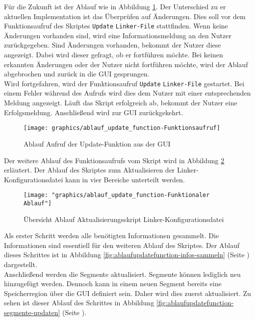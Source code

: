 Für die Zukunft ist der Ablauf wie in Abbildung \ref{fig:ablaufupdatefunction-funktionsaufruf}.
Der Unterschied zu er aktuellen Implementation ist das Überprüfen auf Änderungen.
Dies soll vor dem Funktionsaufruf des Skriptes \verb*|Update| \verb*|Linker-File| stattfinden.
Wenn keine Änderungen vorhanden sind, wird eine Informationsmeldung an den Nutzer zurückgegeben.
Sind Änderungen vorhanden, bekommt der Nutzer diese angezeigt.
Dabei wird dieser gefragt, ob er fortführen möchte.
Bei keinen erkannten Änderungen oder der Nutzer nicht fortführen möchte, wird der Ablauf abgebrochen und zurück in die \ac{GUI} gesprungen. \\

Wird fortgefahren, wird der Funktionsaufruf \verb*|Update| \verb*|Linker-File| gestartet.
Bei einem Fehler während des Aufrufs wird dies dem Nutzer mit einer entsprechenden Meldung angezeigt.
Läuft das Skript erfolgreich ab, bekommt der Nutzer eine Erfolgsmeldung.
Anschließend wird zur \ac{GUI} zurückgekehrt. \\

\begin{figure}[H]
	\centering
	\texttt{[image: graphics/ablauf\_update\_function-Funktionsaufruf]}
	\caption{Ablauf Aufruf der Update-Funktion aus der GUI}
	\label{fig:ablaufupdatefunction-funktionsaufruf}
\end{figure}

Der weitere Ablauf des Funktionsaufrufs vom Skript wird in Abbildung \ref{fig:ablaufupdatefunction-funktionaler-ablauf} erläutert.
Der Ablauf des Skriptes zum Aktualisieren der Linker-Konfigurationsdatei kann in vier Bereiche unterteilt werden. \\

\begin{figure}[H]
	\centering
	\texttt{[image: "graphics/ablauf\_update\_function-Funktionaler Ablauf"]}
	\caption{Übersicht Ablauf Aktualisierungsskript Linker-Konfigurationsdatei}
	\label{fig:ablaufupdatefunction-funktionaler-ablauf}
\end{figure}

Als erster Schritt werden alle benötigten Informationen gesammelt.
Die Informationen sind essentiell für den weiteren Ablauf des Skriptes.
Der Ablauf dieses Schrittes ist in Abbildung \ref{fig:ablaufupdatefunction-infos-sammeln} (Seite \pageref{fig:ablaufupdatefunction-infos-sammeln}) dargestellt. \\

Anschließend werden die Segmente aktualisiert.
Segmente können lediglich neu hinzugefügt werden.
Dennoch kann in einem neuen Segment bereits eine Speicherregion über die \ac{GUI} definiert sein.
Daher wird dies zuerst aktualisiert.
Zu sehen ist dieser Ablauf des Schrittes in Abbildung \ref{fig:ablaufupdatefunction-segmente-updaten} (Seite \pageref{fig:ablaufupdatefunction-segmente-updaten}).\\

